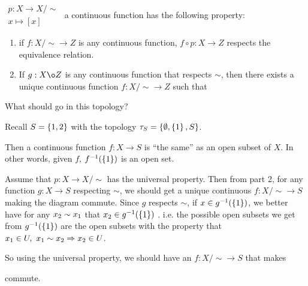 \documentclass[12pt, twosided]{article}
\begin{document}
\begin{thm}
  \(
  \begin{matrix}
    p: X \to X /\sim \\ x \mapsto [x]
  \end{matrix}
  \) {\color{red} a continuous function} has the following property:
  \begin{enumerate}
  \item if \(f: X/\sim \to Z\) is any {\color{red} continuous} function, \(f \circ p: X \to Z\) respects the equivalence relation.
  \item If \(g: X \o Z\) is any {\color{red} continuous} function that respects \(\sim\), then there exists a unique {\color{red} continuous} function \(f: X/\sim \to Z\) such that

    \begin{center}
    \end{center}
  \end{enumerate}
\end{thm}

What should go in this topology?

Recall \(S = \left\{ 1, 2 \right\}\) with the topology \(\tau_S = \left\{ \emptyset, \left\{ 1 \right\}, S \right\}\).

Then a continuous function \(f : X \to S\) is ``the same'' as an open subset of \(X\). In other words, given \(f\), \(f^{-1}(\left\{ 1\right\})\) is an open set.

Assume that \(p: X \to X/\sim\) has the universal property. Then from part 2, for any function \(g: X \to S\) respecting \(\sim\), we should get a unique continuous \(f: X/\sim \to S\) making the diagram commute. Since \(g\) respects \(\sim\), if \(x \in g^{-1}(\left\{ 1 \right\})\), we better have for any \(x_2 \sim x\sb1\) that \(x\sb2 \in g^{-1}(\left\{ 1 \right\})\) .
i.e. the possible open subsets we get from \(g^{-1}(\left\{ 1 \right\})\) are the open subsets with the property that \(x\sb1 \in U,\ x_1 \sim x_2 \Rightarrow x_2 \in U\).

So using the universal property, we should have an \(f: X/\sim \to S\) that makes  commute.
\end{document}
